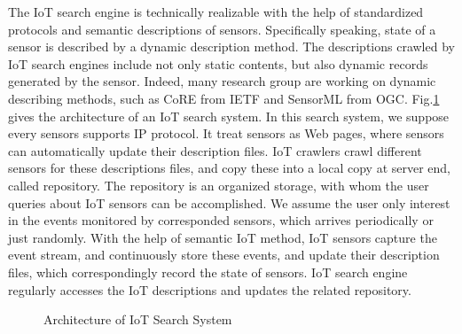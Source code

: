 \documentclass[conference]{IEEEtran}
\begin{document}
The IoT search engine is technically realizable with the help of standardized protocols and semantic descriptions of sensors\cite{Pfisterer2011}. 
Specifically speaking, state of a sensor is described by a dynamic description method.
The descriptions crawled by IoT search engines include not only static contents, but also dynamic records generated by the sensor. 
Indeed, many research group are working on dynamic describing methods, such as CoRE\cite{CoREWorkingGroup2012} from IETF and SensorML\cite{botts2007opengis} from OGC. 
Fig.\ref{fig:architecture} gives the architecture of an IoT search system.
In this search system, we suppose every sensors supports IP protocol.
It treat sensors as Web pages, where sensors can automatically update their description files.
IoT crawlers crawl different sensors for these descriptions files, and copy these into a local copy at server end, called repository. The repository is an organized storage, with whom the user queries about IoT sensors can be accomplished.
We assume the user only interest in the events monitored by corresponded sensors, which arrives periodically or just randomly. 
With the help of semantic IoT method, IoT sensors capture the event stream, and continuously store these events, and update their description files, which correspondingly record the state of sensors. 
IoT search engine regularly accesses the IoT descriptions and updates the related repository.
\begin{figure}
	\centering
	\hspace{-3.0em}
	
	\captionsetup{justification=centering}
	\caption{Architecture of IoT Search System}
	\label{fig:architecture}
\end{figure}
\end{document}
